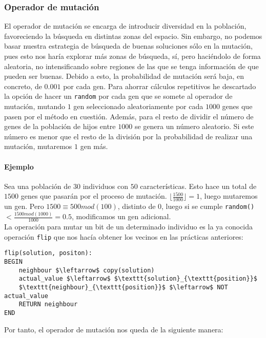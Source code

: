 \documentclass[11pt,leqno]{article}
\begin{document}
	
\subsubsection{Operador de mutación}

	El operador de mutación se encarga de introducir diversidad en la población, favoreciendo la búsqueda en distintas zonas del espacio. Sin embargo, no podemos basar nuestra estrategia de búsqueda de buenas soluciones sólo en la mutación, pues esto nos haría explorar más zonas de búsqueda, sí, pero haciéndolo de forma aleatoria, no intensificando sobre regiones de las que se tenga información de que pueden ser buenas. Debido a esto, la probabilidad de mutación será baja, en concreto, de $0.001$ por cada gen. Para ahorrar cálculos repetitivos he descartado la opción de hacer un \texttt{random} por cada gen que se somete al operador de mutación, mutando $1$ gen seleccionado aleatoriamente por cada $1000$ genes que pasen por el método en cuestión. Además, para el resto de dividir el número de genes de la población de hijos entre $1000$ se genera un número aleatorio. Si este número es menor que el resto de la división por la probabilidad de realizar una mutación, mutaremos $1$ gen más.
	\paragraph{Ejemplo} Sea una población de $30$ individuos con $50$ características. Esto hace un total de $1500$ genes que pasarán por el proceso de mutación. $\lfloor \frac{1500}{1000} \rfloor = 1$, luego mutaremos un gen. Pero $1500 \equiv 500 mod(100)$, distinto de $0$, luego si se cumple \texttt{random()} $ < \frac{1500 mod(1000)}{1000} = 0.5$, modificamos un gen adicional.\\
	La operación para mutar un bit de un determinado individuo es la ya conocida operación \texttt{flip} que nos hacía obtener los vecinos en las prácticas anteriores:
	
\begin{lstlisting}[mathescape=true]
flip(solution, positon):
BEGIN
	neighbour $\leftarrow$ copy(solution)
	actual_value $\leftarrow$ $\texttt{solution}_{\texttt{position}}$
	$\texttt{neighbour}_{\texttt{position}}$ $\leftarrow$ NOT actual_value
	RETURN neighbour
END
\end{lstlisting}

	Por tanto, el operador de mutación nos queda de la siguiente manera: 
	
\end{document}
